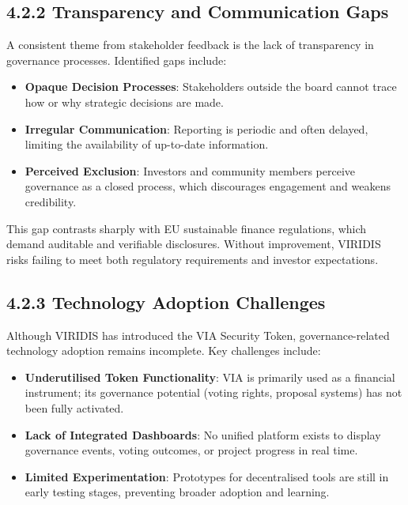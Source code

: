 \documentclass[
  english,
  12pt,
  oneside,
  open=any]{scrbook}
\providecommand{\tightlist}{%
  \setlength{\itemsep}{0pt}\setlength{\parskip}{0pt}}\usepackage{longtable,booktabs,array}
\begin{document}
\subsection{4.2.2 Transparency and Communication Gaps}\label{sec-comm}

A consistent theme from stakeholder feedback is the lack of transparency
in governance processes. Identified gaps include:

\begin{itemize}
\tightlist
\item
  \textbf{Opaque Decision Processes}: Stakeholders outside the board
  cannot trace how or why strategic decisions are made.\\
\item
  \textbf{Irregular Communication}: Reporting is periodic and often
  delayed, limiting the availability of up-to-date information.\\
\item
  \textbf{Perceived Exclusion}: Investors and community members perceive
  governance as a closed process, which discourages engagement and
  weakens credibility.
\end{itemize}

This gap contrasts sharply with EU sustainable finance regulations,
which demand auditable and verifiable disclosures. Without improvement,
VIRIDIS risks failing to meet both regulatory requirements and investor
expectations.

\subsection{4.2.3 Technology Adoption Challenges}\label{sec-tech-chal}

Although VIRIDIS has introduced the VIA Security Token,
governance-related technology adoption remains incomplete. Key
challenges include:

\begin{itemize}
\tightlist
\item
  \textbf{Underutilised Token Functionality}: VIA is primarily used as a
  financial instrument; its governance potential (voting rights,
  proposal systems) has not been fully activated.\\
\item
  \textbf{Lack of Integrated Dashboards}: No unified platform exists to
  display governance events, voting outcomes, or project progress in
  real time.\\
\item
  \textbf{Limited Experimentation}: Prototypes for decentralised tools
  are still in early testing stages, preventing broader adoption and
  learning.
\end{itemize}
\end{document}
